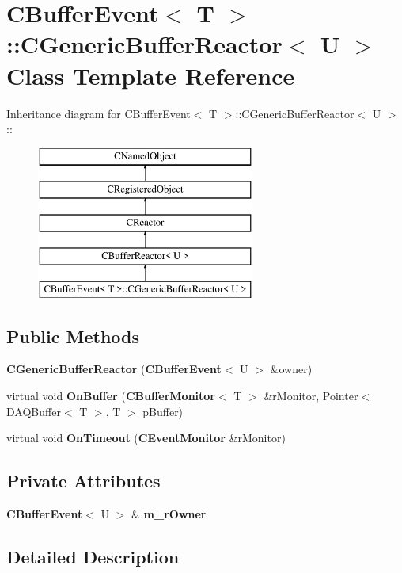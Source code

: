 \section{CBuffer\-Event$<$ T $>$::CGeneric\-Buffer\-Reactor$<$ U $>$  Class Template Reference}
\label{classCBufferEvent_1_1CGenericBufferReactor}
Inheritance diagram for CBuffer\-Event$<$ T $>$::CGeneric\-Buffer\-Reactor$<$ U $>$::\begin{figure}[H]
\begin{center}
\leavevmode
\includegraphics[height=5cm]{classCBufferEvent_1_1CGenericBufferReactor}
\end{center}
\end{figure}
\subsection*{Public Methods}
\begin{CompactItemize}
\item 
{\bf CGeneric\-Buffer\-Reactor} ({\bf CBuffer\-Event}$<$ U $>$ \&owner)
\item 
virtual void {\bf On\-Buffer} ({\bf CBuffer\-Monitor}$<$ T $>$ \&r\-Monitor, Pointer$<$ DAQBuffer$<$ T $>$, T $>$ p\-Buffer)
\item 
virtual void {\bf On\-Timeout} ({\bf CEvent\-Monitor} \&r\-Monitor)
\end{CompactItemize}
\subsection*{Private Attributes}
\begin{CompactItemize}
\item 
{\bf CBuffer\-Event}$<$ U $>$ \& {\bf m\_\-r\-Owner}
\end{CompactItemize}


\subsection{Detailed Description}
